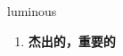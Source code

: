 
\begin{frame}
{\huge luminous}
\begin{center}
\begin{enumerate}\Large
  \item \textbf{杰出的，重要的}
\end{enumerate}
\end{center}
\end{frame}
